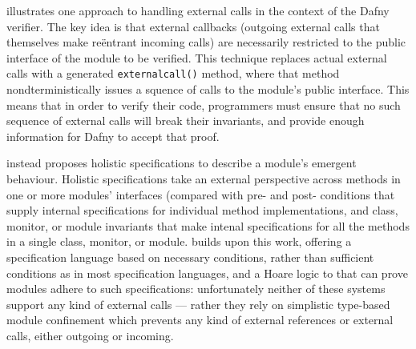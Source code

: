 \citet{CassezFQ24} illustrates one approach to handling external
calls in the context of the Dafny verifier. The key idea is that
external callbacks (outgoing external calls that themselves make
re{\"e}ntrant incoming calls) are necessarily restricted to the public
interface of the module to be verified.  This technique replaces
actual external calls with a generated \texttt{externalcall()} method,
where that method nondterministically issues a squence of calls to the
module's public interface.  This means that in order to verify their
code, programmers must ensure that no such sequence of external calls
will break their invariants, and provide enough information for Dafny
to accept that proof.





\citet{FASE} instead proposes holistic specifications to describe a
module's emergent behaviour. Holistic specifications take an external
perspective across methods in one or more modules' interfaces
(compared with pre- and post- conditions that supply internal
specifications for individual method implementations, and class,
monitor, or module invariants that make intenal specifications for all
the methods in a single class, monitor, or module.
\citet{OOPSLA22} builds upon this work, offering a specification
language based on necessary conditions, rather than sufficient
conditions as in most specification languages, and a Hoare logic to 
that can prove modules  adhere to such specifications: unfortunately
neither of these systems support any kind of external calls --- rather
they rely on simplistic type-based module confinement
\cite{ownership-confinement-jacm2004,confined-toplas2007} which
prevents any kind of external references or external calls, either
outgoing or incoming.

